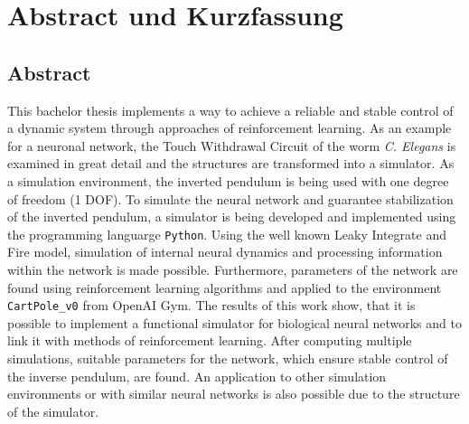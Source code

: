 %
\chapter*{Abstract und Kurzfassung}
%

%
\section*{Abstract}
%
This bachelor thesis implements a way to achieve a reliable and stable control of a dynamic system through approaches of reinforcement learning. As an example for a neuronal network, the \glqq Touch Withdrawal Circuit\grqq{} of the worm \textit{C. Elegans} is examined in great detail and the structures are transformed into a simulator. As a simulation environment, the inverted pendulum is being used with one degree of freedom (1 DOF). To simulate the neural network and guarantee stabilization of the inverted pendulum, a simulator is being developed and implemented using the programming languarge \texttt{Python}. Using the well known Leaky Integrate and Fire model, simulation of internal neural dynamics and processing information within the network is made possible. Furthermore, parameters of the network are found using reinforcement learning algorithms and applied to the environment \texttt{CartPole\_v0} from OpenAI Gym. The results of this work show, that it is possible to implement a functional simulator for biological neural networks and to link it with methods of reinforcement learning. After computing multiple simulations, suitable parameters for the network, which ensure stable control of the inverse pendulum, are found. An application to other simulation environments or with similar neural networks is also possible due to the structure of the simulator.


%
